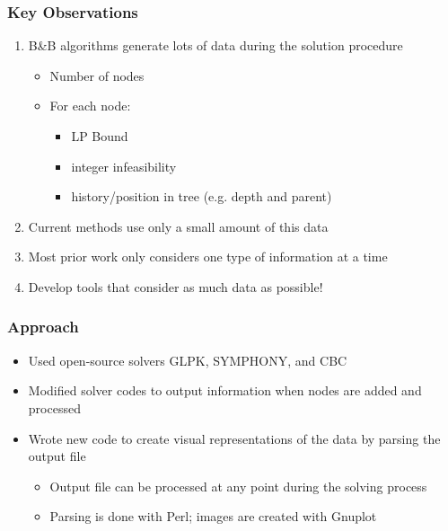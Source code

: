 \documentclass{beamer}
\begin{document}
\begin{frame}
\frametitle{Key Observations}

\begin{enumerate}[<+->]
\item B\&B algorithms generate lots of data during the solution procedure
    \begin{itemize}[<+->]
    \item Number of nodes
    \item For each node:
        \begin{itemize}         
        \item LP Bound
        \item integer infeasibility
        \item history/position in tree (e.g. depth and parent) 
        \end{itemize}
    \end{itemize} 
\item Current methods use only a small amount of this data
\item Most prior work only considers one type of information at a time
\item \alert {Develop tools that consider as much data as possible!} 
\end{enumerate}
\end{frame}

\begin{frame}
\frametitle{Approach}

\begin{itemize}[<+->]
\item Used open-source solvers GLPK, SYMPHONY, and CBC
\item Modified solver codes to output information when nodes are added and
processed
\item Wrote new code to create visual representations of the data by parsing
the output file
    \begin{itemize}[<+->]
    \item Output file can be processed at any point during the solving process 
    \item Parsing is done with Perl; images are created with Gnuplot
    \end{itemize}
\end{itemize}
\end{frame}
\end{document}
